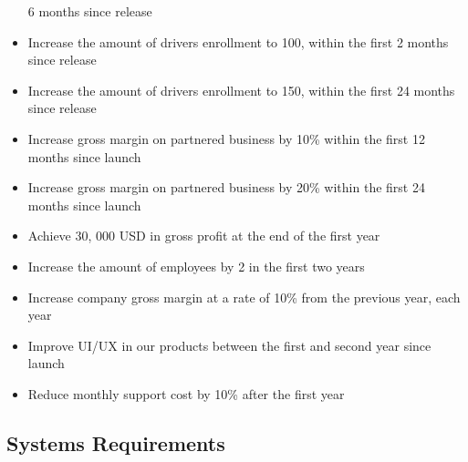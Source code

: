 \begin{itemize}
    6 months since release
    \item Increase the amount of drivers enrollment to 100, within the first 
    2 months since release
    \item Increase the amount of drivers enrollment to 150, within the first 
    24 months since release
    \item Increase gross margin on partnered business by 10\% within the 
    first 12 months since launch
    \item Increase gross margin on partnered business by 20\% within the 
    first 24 months since launch
    \item Achieve 30, 000 USD in gross profit at the end of the first year
    \item Increase the amount of employees by 2 in the first two years
    \item Increase company gross margin at a rate of 10\% from the previous 
    year, each year
    \item Improve UI/UX in our products between the first and second year 
    since launch
    \item Reduce monthly support cost by 10\% after the first year
\end{itemize}
\pagebreak
\subsection{Systems Requirements}
